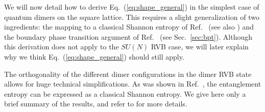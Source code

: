 \documentclass[11pt]{iopart}
\begin{document}
We will now detail how to derive Eq.~(\ref{eq:shape_general}) in the simplest case of quantum dimers on the square lattice. This requires a slight generalization of two ingredients: the mapping to a classical Shannon entropy of Ref.~\cite{Shannonee} (see also \cite{FurukawaMisguich}) and the boundary phase transition argument of Ref.~\cite{Stephan2011} (see Sec.~\ref{sec:bpt}). Although this derivation does not apply to the $SU(N)$ RVB case, we will later explain why we think Eq.~(\ref{eq:shape_general}) should still apply.

The orthogonality of the different dimer configurations in the dimer RVB state allows for huge technical simplifications. As was shown in Ref.~\cite{Shannonee}, the entanglement entropy can be expressed as a classical Shannon entropy. We give here only a brief summary of the results, and refer to \cite{Shannonee} for more details.
\end{document}
